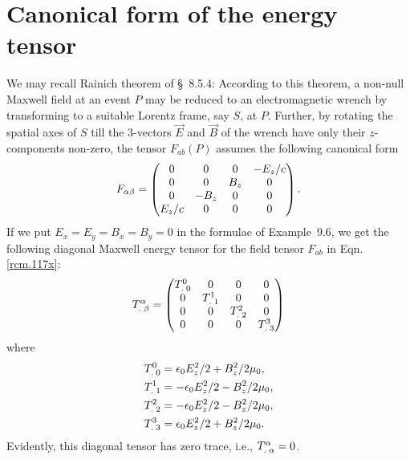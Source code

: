 \section{Canonical form of the energy tensor}
 We may recall Rainich theorem of 
\S~8.5.4: According to this theorem, a non-null Maxwell 
field at an event $P$ may be reduced to an electromagnetic 
wrench by transforming to a suitable Lorentz frame, say 
$S$, 
at $P$. Further, by rotating the spatial axes of $S$ till 
the 3-vectors $\vec{E}$ and $\vec{B}$ of the wrench have 
only 
their  $z$-components non-zero, the tensor $F_{ab}(P)$ 
assumes the following canonical form 
\begin{align}\label{rcm.117x}
F_{{\alpha}{\beta}}=\begin{pmatrix}
 0  & 0 & 0 & -E_z/c\\
0 & 0  & B_z  & 0\\
0 & - B_z  & 0   & 0\\
E_z/c & 0  & 0  & 0\\
\end{pmatrix}.
\end{align}
If we put $E_x=E_y=B_x=B_y=0$ in the formulae of 
Example~9.6, we get the following diagonal Maxwell energy 
tensor for the field tensor $F_{ab}$ in 
Eqn.\eqref{rcm.117x}:
 \begin{align}\label{rcm.105}
{\ensuremath{{T}^{{\alpha}}_{.\;{\beta}}}}=\begin{pmatrix}
{\ensuremath{{T}^{0}_{.\;0}}}  & 0 & 0  & 0\\
0  & {{T}^{1}_{.\;1}} &0 & 0\\
0 & 0 & {{T}^{2}_{.\;2}} &  0 \\
0 &   0     &   0    & {{T}^{3}_{.\;3}}
\end{pmatrix}
\end{align}
where
\begin{align}\label{rcm.106}
{\ensuremath{{T}^{0}_{.\;0}}}&=\epsilon_0 E_z^2/2+B_z^2/2\mu_0,\\\label{rcm.107}
{\ensuremath{{T}^{1}_{.\;1}}}&=-\epsilon_0 E_z^2/2-B_z^2/2\mu_0,\\\label{rcm.108}
{\ensuremath{{T}^{2}_{.\;2}}}&=-\epsilon_0 E_z^2/2-B_z^2/2\mu_0,\\\label{rcm.109}
{\ensuremath{{T}^{3}_{.\;3}}}&=\epsilon_0 E_z^2/2+B_z^2/2\mu_0.
\end{align}
Evidently, this diagonal tensor has zero trace, i.e.,  
${{T}^{{\alpha}}_{.\;{\alpha}}}=0$.

